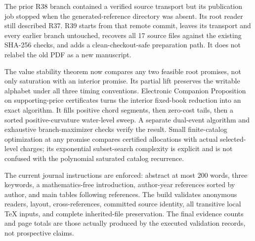\documentclass[11pt,letterpaper]{article}
\begin{document}
The prior R38 branch contained a verified source transport but its publication job stopped when the generated-reference directory was absent. Its root reader still described R37. R39 starts from that remote commit, leaves its transport and every earlier branch untouched, recovers all 17 source files against the existing SHA-256 checks, and adds a clean-checkout-safe preparation path. It does not relabel the old PDF as a new manuscript.



The value stability theorem now compares any two feasible root promises, not only saturation with an interior promise. Its partial lift preserves the writable alphabet under all three timing conventions. Electronic Companion Proposition on supporting-price certificates turns the interior fixed-book reduction into an exact algorithm. It fills positive chord segments, then zero-cost tails, then a sorted positive-curvature water-level sweep. A separate dual-event algorithm and exhaustive branch-maximizer checks verify the result. Small finite-catalog optimization at any promise compares certified allocations with actual selected-level charges; its exponential subset-search complexity is explicit and is not confused with the polynomial saturated catalog recurrence.



The current journal instructions are enforced: abstract at most 200 words, three keywords, a mathematics-free introduction, author-year references sorted by author, and main tables following references. The build validates anonymous readers, layout, cross-references, committed source identity, all transitive local TeX inputs, and complete inherited-file preservation. The final evidence counts and page totals are those actually produced by the executed validation records, not prospective claims.
\end{document}
